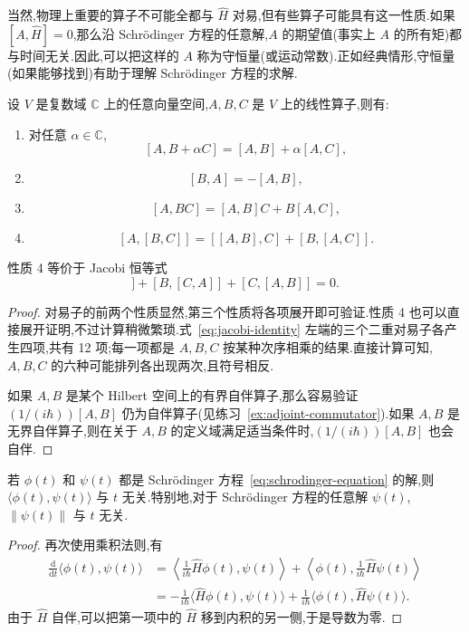 当然,物理上重要的算子不可能全都与 \(\widehat H\) 对易,但有些算子可能具有这一性质.如果 \([A,\widehat H]=0\),那么沿 Schrödinger 方程的任意解,\(A\) 的期望值(事实上 \(A\) 的所有矩)都与时间无关.因此,可以把这样的 \(A\) 称为守恒量(或运动常数).正如经典情形,守恒量(如果能够找到)有助于理解 Schrödinger 方程的求解.

\begin{proposition}[对易子的基本性质]\label{prop:commutator-properties}
设 \(V\) 是复数域 \(\mathbb{C}\) 上的任意向量空间,\(A,B,C\) 是 \(V\) 上的线性算子,则有:
\begin{enumerate}
\item 对任意 \(\alpha\in\mathbb{C}\),
\[
[A,B+\alpha C]=[A,B]+\alpha[A,C],
\]
\item
\[
[B,A]=-[A,B],
\]
\item
\[
[A,BC]=[A,B]C+B[A,C],
\]
\item
\[
[A,[B,C]]=[[A,B],C]+[B,[A,C]].
\]
\end{enumerate}
性质 4 等价于 Jacobi 恒等式
\begin{equation}
[A,[B,C]]+[B,[C,A]]+[C,[A,B]]=0.
\label{eq:jacobi-identity}
\end{equation}
\end{proposition}

\begin{proof}
对易子的前两个性质显然,第三个性质将各项展开即可验证.性质 4 也可以直接展开证明,不过计算稍微繁琐.式~\eqref{eq:jacobi-identity} 左端的三个二重对易子各产生四项,共有 12 项;每一项都是 \(A,B,C\) 按某种次序相乘的结果.直接计算可知,\(A,B,C\) 的六种可能排列各出现两次,且符号相反.

如果 \(A,B\) 是某个 Hilbert 空间上的有界自伴算子,那么容易验证 \((1/(i\hbar))[A,B]\) 仍为自伴算子(见练习~\ref{ex:adjoint-commutator}).如果 \(A,B\) 是无界自伴算子,则在关于 \(A,B\) 的定义域满足适当条件时,\((1/(i\hbar))[A,B]\) 也会自伴.
\end{proof}

\begin{proposition}[内积守恒]\label{prop:inner-product-conservation}
若 \(\phi(t)\) 和 \(\psi(t)\) 都是 Schrödinger 方程~\eqref{eq:schrodinger-equation} 的解,则 \(\langle\phi(t),\psi(t)\rangle\) 与 \(t\) 无关.特别地,对于 Schrödinger 方程的任意解 \(\psi(t)\),\(\|\psi(t)\|\) 与 \(t\) 无关.
\end{proposition}

\begin{proof}
再次使用乘积法则,有
\[
\begin{aligned}
\frac{\mathrm{d}}{\mathrm{d}t}\langle\phi(t),\psi(t)\rangle
&=\left\langle\frac{1}{i\hbar}\widehat H\phi(t),\psi(t)\right\rangle
+\left\langle\phi(t),\frac{1}{i\hbar}\widehat H\psi(t)\right\rangle\\
&=-\frac{1}{i\hbar}\langle\widehat H\phi(t),\psi(t)\rangle
+\frac{1}{i\hbar}\langle\phi(t),\widehat H\psi(t)\rangle.
\end{aligned}
\]
由于 \(\widehat H\) 自伴,可以把第一项中的 \(\widehat H\) 移到内积的另一侧,于是导数为零.
\end{proof}

